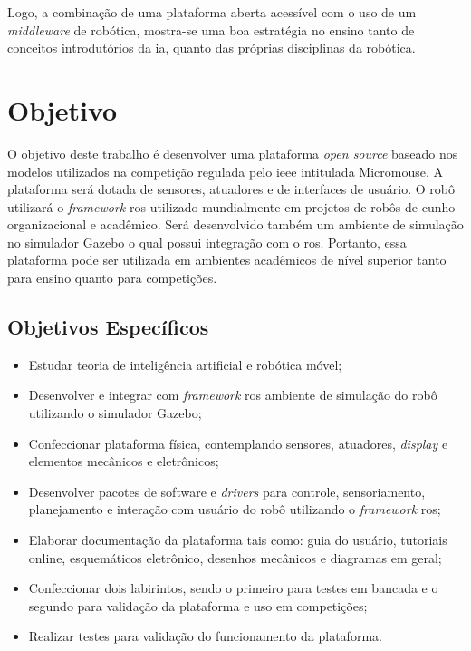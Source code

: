 Logo, a combinação de uma plataforma aberta acessível com o uso de um \textit{middleware} de robótica, mostra-se uma boa estratégia no ensino tanto de conceitos introdutórios da \gls*{ia}, quanto das próprias disciplinas da robótica.


\section{Objetivo}
\label{sec:objetivo_geral}
O objetivo deste trabalho é desenvolver uma plataforma \textit{open source} baseado nos modelos utilizados na competição regulada pelo \gls*{ieee} intitulada Micromouse. A plataforma será dotada de sensores, atuadores e de interfaces de usuário. O robô utilizará o \textit{framework} \gls*{ros} utilizado mundialmente em projetos de robôs de cunho organizacional e acadêmico. Será desenvolvido também um ambiente de simulação no simulador Gazebo o qual possui integração com o \gls*{ros}. Portanto, essa plataforma pode ser utilizada em ambientes acadêmicos de nível superior tanto para ensino quanto para competições.

\subsection{Objetivos Específicos}
\label{ssec:objesp}
\begin{itemize}
	\item Estudar teoria de inteligência artificial e robótica móvel;
	\item Desenvolver e integrar com \textit{framework} \gls*{ros} ambiente de simulação do robô utilizando o simulador Gazebo;
	\item Confeccionar plataforma física, contemplando sensores, atuadores, \textit{display} e elementos mecânicos e eletrônicos;
	\item Desenvolver pacotes de software e \textit{drivers} para controle, sensoriamento, planejamento e interação com usuário do robô utilizando o \textit{framework} \gls*{ros};
	\item Elaborar documentação da plataforma tais como: guia do usuário, tutoriais online, esquemáticos eletrônico, desenhos mecânicos e diagramas em geral;
	\item Confeccionar dois labirintos, sendo o primeiro para testes em bancada e o segundo para validação da plataforma e uso em competições;
	\item Realizar testes para validação do funcionamento da plataforma. 
	
\end{itemize}

